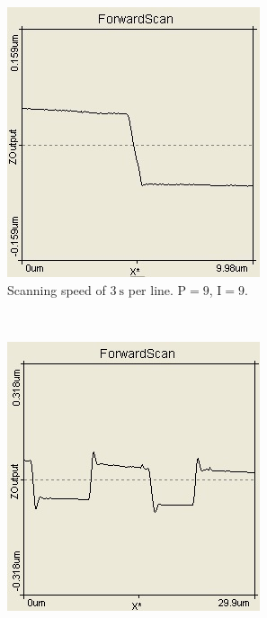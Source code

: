 \documentclass[paper=a4,fontsize=10pt,DIV=18,twocolumn,parskip=half]{scrartcl}
\numberwithin{equation}{section}    %
\begin{document}
\begin{figure}
    \begin{subfigure}{0.45\columnwidth}
        \includegraphics[width=\textwidth]{Bilder/slow}
        \caption{Scanning speed of $\SI{3}{\second}$ per line. $\mathrm{P}=9$, 
        $\mathrm{I}=9$.}
        \label{slow}
    \end{subfigure}
    ~
    \begin{subfigure}{0.45\columnwidth}
         \includegraphics[width=\textwidth]{Bilder/fast}

\end{subfigure}
\end{figure}
\end{document}
